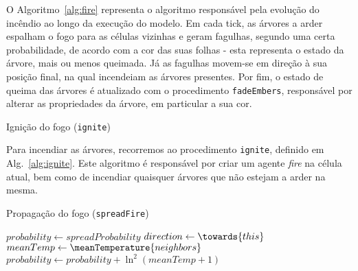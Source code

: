 O Algoritmo~\ref{alg:fire} representa o algoritmo responsável pela evolução do incêndio ao longo da execução do modelo. Em cada tick, as árvores a arder espalham o fogo para as células vizinhas e geram fagulhas, segundo uma certa probabilidade, de acordo com a cor das suas folhas - esta representa o estado da árvore, mais ou menos queimada. Já as fagulhas movem-se em direção à sua posição final, na qual incendeiam as árvores presentes. Por fim, o estado de queima das árvores é atualizado com o procedimento \texttt{fadeEmbers}, responsável por alterar as propriedades da árvore, em particular a sua cor.

\begin{algorithm}
    \caption{Ignição do fogo (\texttt{ignite})}\label{alg:ignite}
    \;
\end{algorithm}

Para incendiar as árvores, recorremos ao procedimento \texttt{ignite}, definido em Alg.~\ref{alg:ignite}. Este algoritmo é responsável por criar um agente \textit{fire} na célula atual, bem como de incendiar quaisquer árvores que não estejam a arder na mesma.


\begin{algorithm}
    \caption{Propagação do fogo (\texttt{spreadFire})}\label{alg:spread_fire}
    $probability \gets spreadProbability$\;
    $direction \gets \towards{this}$\;
    $meanTemp \gets \meanTemperature{neighbors}$\;
    $probability \gets probability + \ln^2{(meanTemp + 1)}$\;
\end{algorithm}

